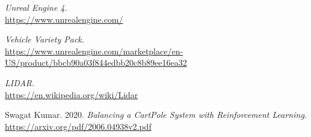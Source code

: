 \documentclass[14pt]{extarticle}
\begin{document}
\begin{thebibliography}{999}
  \emph{Unreal Engine 4}.\\
  \url{https://www.unrealengine.com/}
   
   
  \emph{Vehicle Variety Pack}.\\
  \url{https://www.unrealengine.com/marketplace/en-US/product/bbcb90a03f844edbb20c8b89ee16ea32}
  
  \emph{LIDAR}.\\
  \url{https://en.wikipedia.org/wiki/Lidar}
  
  Swagat Kumar. 2020.
  \emph{Balancing a CartPole System with Reinforcement Learning}.\\
  \url{https://arxiv.org/pdf/2006.04938v2.pdf}
  
   

\end{thebibliography}
\end{document}
